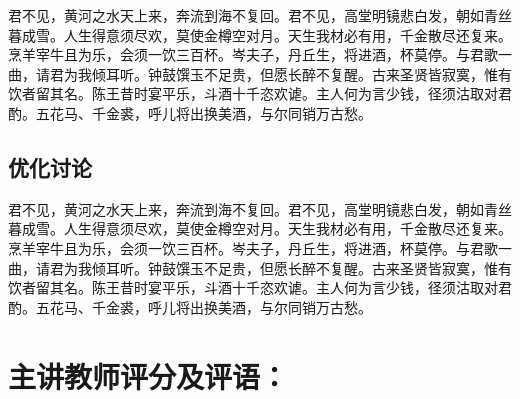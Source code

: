 \documentclass[a4paper, UTF8]{ctexart}
\begin{document}
\begin{multicols}{2}
	君不见，黄河之水天上来，奔流到海不复回。君不见，高堂明镜悲白发，朝如青丝暮成雪。人生得意须尽欢，莫使金樽空对月。天生我材必有用，千金散尽还复来。烹羊宰牛且为乐，会须一饮三百杯。岑夫子，丹丘生，将进酒，杯莫停。与君歌一曲，请君为我倾耳听。钟鼓馔玉不足贵，但愿长醉不复醒。古来圣贤皆寂寞，惟有饮者留其名。陈王昔时宴平乐，斗酒十千恣欢谑。主人何为言少钱，径须沽取对君酌。五花马、千金裘，呼儿将出换美酒，与尔同销万古愁。
	
	\subsection{优化讨论}%
	
	君不见，黄河之水天上来，奔流到海不复回。君不见，高堂明镜悲白发，朝如青丝暮成雪。人生得意须尽欢，莫使金樽空对月。天生我材必有用，千金散尽还复来。烹羊宰牛且为乐，会须一饮三百杯。岑夫子，丹丘生，将进酒，杯莫停。与君歌一曲，请君为我倾耳听。钟鼓馔玉不足贵，但愿长醉不复醒。古来圣贤皆寂寞，惟有饮者留其名。陈王昔时宴平乐，斗酒十千恣欢谑。主人何为言少钱，径须沽取对君酌。五花马、千金裘，呼儿将出换美酒，与尔同销万古愁。
	
	\end{multicols}

	\section*{主讲教师评分及评语：}


	\clearpage
	\printbibliography[heading=bibintoc,title=参考文献]%
\end{document}
